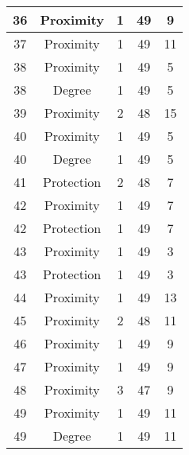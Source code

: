 \documentclass[results.tex]{subfiles}
\begin{document}
\begin{center}
\begin{tabular}{| c || c | c | c | c |}
    \hline
    36 & Proximity & 1 & 49 & 9 \\ 
    \hline
    37 & Proximity & 1 & 49 & 11 \\ 
    \hline
    38 & Proximity & 1 & 49 & 5 \\ 
    \hline
    38 & Degree & 1 & 49 & 5 \\ 
    \hline
    39 & Proximity & 2 & 48 & 15 \\ 
    \hline
    40 & Proximity & 1 & 49 & 5 \\ 
    \hline
    40 & Degree & 1 & 49 & 5 \\ 
    \hline
    41 & Protection & 2 & 48 & 7 \\ 
    \hline
    42 & Proximity & 1 & 49 & 7 \\ 
    \hline
    42 & Protection & 1 & 49 & 7 \\ 
    \hline
    43 & Proximity & 1 & 49 & 3 \\ 
    \hline
    43 & Protection & 1 & 49 & 3 \\ 
    \hline
    44 & Proximity & 1 & 49 & 13 \\ 
    \hline
    45 & Proximity & 2 & 48 & 11 \\ 
    \hline
    46 & Proximity & 1 & 49 & 9 \\ 
    \hline
    47 & Proximity & 1 & 49 & 9 \\ 
    \hline
    48 & Proximity & 3 & 47 & 9 \\ 
    \hline
    49 & Proximity & 1 & 49 & 11 \\ 
    \hline
    49 & Degree & 1 & 49 & 11 \\ 
    \hline   \end{tabular}
\end{center}
\end{document}
